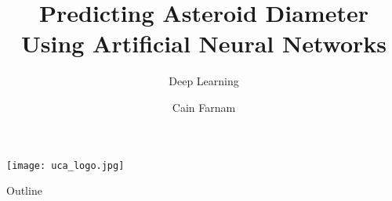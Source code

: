 
\usepackage[utf8]{inputenc}


\usepackage{amsmath}
\usepackage{amsfonts}
\usepackage{amssymb}
\usepackage{graphicx}
\usepackage{array}
\usepackage{tcolorbox}
\usepackage{colortbl}
\usepackage{float}
\usepackage{multicol}
\usepackage{mathtools}


\author{Cain Farnam}
\title[Deep Learing]{Predicting Asteroid Diameter Using Artificial Neural Networks}
\subtitle{Deep Learning}
\date{} 



\begin{frame}
\maketitle
\begin{center}
    \texttt{[image: uca\_logo.jpg]}
\end{center}
\end{frame}

\begin{frame}{Outline}
	\tableofcontents
\end{frame}
